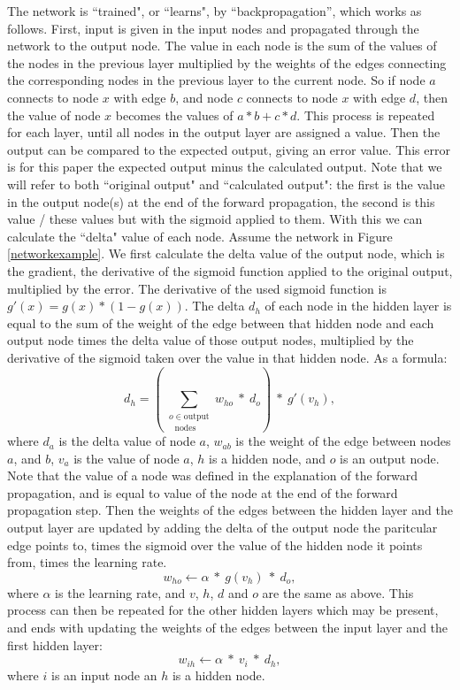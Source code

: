 \documentclass[a4paper, 10pt, notitlepage, twocolumn]{article}
\begin{document}
    The network is ``trained",  or ``learns",  by ``backpropagation'',  which works as follows. First,  input is given in the input nodes and propagated through the network to the output node. The value in each node is the sum of the values of the nodes in the previous layer multiplied by the weights of the edges connecting the corresponding nodes in the previous layer to the current node. So if node $a$ connects to node $x$ with edge $b$,  and node $c$ connects to node $x$ with edge $d$,  then the value of node $x$ becomes the values of $a * b + c * d$. This process is repeated for each layer,  until all nodes in the output layer are assigned a value. Then the output can be compared to the expected output,  giving an error value. This error is for this paper the expected output minus the calculated output. Note that we will refer to both ``original output" and ``calculated output": the first is the value in the output node(s) at the end of the forward propagation,  the second is this value / these values but with the sigmoid applied to them. With this we can calculate the ``delta" value of each node. Assume the network in Figure \ref{networkexample}. We first calculate the delta value of the output node,  which is the  gradient,  the derivative of the sigmoid function applied to the original output,  multiplied by the error. The derivative of the used sigmoid function is $g'(x) = g(x) * (1  - g(x))$. The delta $d_h$ of each node in the hidden layer is equal to the sum of the weight of the edge between that hidden node and each output node times the delta value of those output nodes,  multiplied by the derivative of the sigmoid taken over the value in that hidden node. As a formula: $$d_h = (\sum\limits_{\substack{o \in \text{output}\\\text{~~nodes}}} w_{ho}~*~d_o)~*~g'(v_h), $$where $d_a$ is the delta value of node $a$,  $w_{ab}$ is the weight of the edge between nodes $a$,  and $b$,  $v_a$ is the value of node $a$,  $h$ is a hidden node,  and $o$ is an output node. Note that the value of a node was defined in the explanation of the forward propagation,  and is equal to value of the node at the end of the forward propagation step. Then the weights of the edges between the hidden layer and the output layer are updated by adding the delta of the output node the paritcular edge points to,  times the sigmoid over the value of the hidden node it points from,  times the learning rate. $$w_{ho} \leftarrow \alpha~*~g(v_h)~*~d_o, $$where $\alpha$ is the learning rate,  and $v$,  $h$,  $d$ and $o$ are the same as above. This process can then be repeated for the other hidden layers which may be present,  and ends with updating the weights of the edges between the input layer and the first hidden layer: $$w_{ih} \leftarrow \alpha~*~v_i~*~d_h, $$ where $i$ is an input node an $h$ is a hidden node.
        
\end{document}
